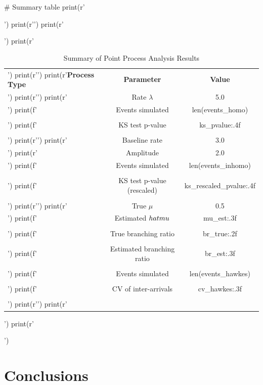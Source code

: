 \documentclass[a4paper, 11pt]{article}
\begin{document}
\begin{pycode}
# Summary table
print(r'\begin{table}[htbp]')
print(r'\centering')
print(r'\caption{Summary of Point Process Analysis Results}')
print(r'\begin{tabular}{@{}lcc@{}}')
print(r'\toprule')
print(r'\textbf{Process Type} & \textbf{Parameter} & \textbf{Value} \\')
print(r'\midrule')
print(r'\multirow{3}{*}{Homogeneous Poisson} & Rate $\lambda$ & 5.0 \\')
print(f'& Events simulated & {len(events_homo)} \\\\')
print(f'& KS test p-value & {ks_pvalue:.4f} \\\\')
print(r'\midrule')
print(r'\multirow{4}{*}{Inhomogeneous Poisson} & Baseline rate & 3.0 \\')
print(r'& Amplitude & 2.0 \\')
print(f'& Events simulated & {len(events_inhomo)} \\\\')
print(f'& KS test p-value (rescaled) & {ks_rescaled_pvalue:.4f} \\\\')
print(r'\midrule')
print(r'\multirow{6}{*}{Hawkes Process} & True $\mu$ & 0.5 \\')
print(f'& Estimated $\\hat{{\\mu}}$ & {mu_est:.3f} \\\\')
print(f'& True branching ratio & {br_true:.2f} \\\\')
print(f'& Estimated branching ratio & {br_est:.3f} \\\\')
print(f'& Events simulated & {len(events_hawkes)} \\\\')
print(f'& CV of inter-arrivals & {cv_hawkes:.3f} \\\\')
print(r'\bottomrule')
print(r'\end{tabular}')
print(r'\end{table}')
\end{pycode}

\section{Conclusions}
\end{document}

